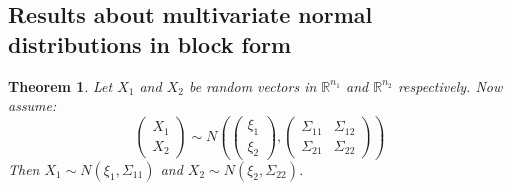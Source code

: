 \documentclass[12pt, a4paper]{article}
\newtheorem{theorem}{Theorem}[section]
\numberwithin{equation}{section}
\begin{document}
\subsection{Results about multivariate normal distributions in block form}
\begin{theorem}
\label{block_split}
Let $X_1$ and $X_2$ be random vectors in $\mathbb{R}^{n_1}$ and $\mathbb{R}^{n_2}$ respectively. Now assume:
\begin{equation}
\begin{pmatrix}
X_1 \\ X_2
\end{pmatrix}
\sim N\left(
\begin{pmatrix}
\xi_1 \\ \xi_2
\end{pmatrix},
\begin{pmatrix}
\Sigma_{11} & \Sigma_{12} \\
\Sigma_{21} & \Sigma_{22}
\end{pmatrix}
\right)
\end{equation}
Then $X_1\sim N(\xi_1,\Sigma_{11})$ and $X_2\sim N(\xi_2,\Sigma_{22})$.
\end{theorem}
\end{document}
